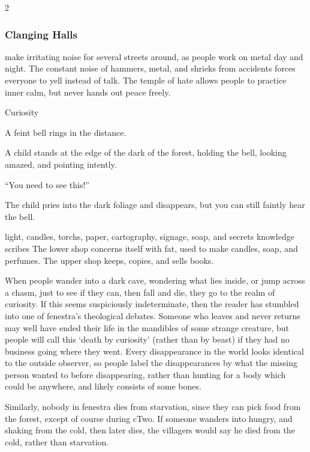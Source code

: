 \begin{multicols}{2}
\subsubsection{Clanging Halls}
make irritating noise for several streets around, as people work on metal day and night.
The constant noise of hammers, metal, and shrieks from accidents forces everyone to yell instead of talk.
The temple of hate allows people to practice inner calm, but never hands out peace freely.

\null

\bigbreak

  {Curiosity}%
  {
    A feint bell rings in the distance.

    A child stands at the edge of the dark of the forest, holding the bell, looking amazed, and pointing intently.

    {\sffamily``You need to see this!''}

    The child pries into the dark foliage and disappears, but you can still faintly hear the bell.
  }%
  {light, candles, \glspl{torch}, paper, cartography, signage, soap, and secrets}%
  {knowledge}%
  {\Glspl{scribe}}%
  {
    The lower shop concerns itself with fat, used to make candles, soap, and perfumes.
    The upper shop keeps, copies, and sells books.
  }%


When people wander into a dark cave, wondering what lies inside, or jump across a chasm, just to see if they can, then fall and die, they go to the realm of curiosity.%
If this seems suspiciously indeterminate, then the reader has stumbled into one of \gls{fenestra}'s theological debates.
Someone who leaves and never returns may well have ended their life in the mandibles of some strange creature, but people will call this `death by curiosity' (rather than by beast) if they had no business going where they went.
Every disappearance in the world looks identical to the outside observer, so people label the disappearances by what the missing person wanted to before disappearing, rather than hunting for a body which could be anywhere, and likely consists of some bones.

Similarly, nobody in \gls{fenestra} dies from starvation, since they can pick food from the forest, except of course during \gls{cTwo}.
If someone wanders into  hungry, and shaking from the cold, then later dies, the villagers would say he died from the cold, rather than starvation.


\end{multicols}
